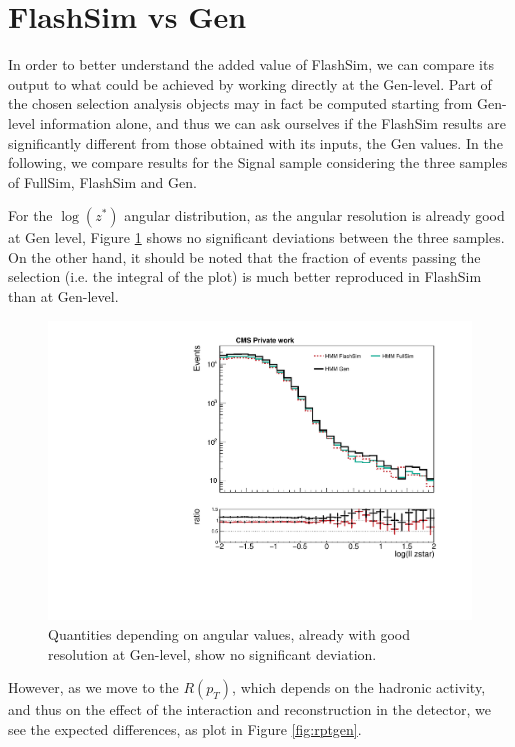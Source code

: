 \section{FlashSim vs Gen}

In order to better understand the added value of FlashSim, we can compare its output to what could be achieved by working directly at the Gen-level. Part of the chosen selection analysis objects may in fact be computed starting from Gen-level information alone, and thus we can ask ourselves if the FlashSim results are significantly different from those obtained with its inputs, the Gen values. In the following, we compare results for the Signal sample considering the three samples of FullSim, FlashSim and Gen.

For the $\log(z^*)$ angular distribution, as the angular resolution is already good at Gen level, Figure \ref{fig:zstargen} shows no significant deviations between the three samples. On the other hand, it should be noted that the fraction of events passing the selection (i.e. the integral of the plot) is much better reproduced in FlashSim than at Gen-level.

\begin{figure}
    \centering
    \includegraphics[width=\linewidth]{gfx/ch6/gen_vs_flash_ll_zstar_log___PreSel_log.pdf}
    \caption[Gen vs FlashSim for $z^*$]{Quantities depending on angular values, already with good resolution at Gen-level, show no significant deviation.}
    \label{fig:zstargen}
   \end{figure}
 
However, as we move to the $R(p_T)$, which depends on the hadronic activity, and thus on the effect of the interaction and reconstruction in the detector, we see the expected differences, as plot in Figure \ref{fig:rptgen}.

